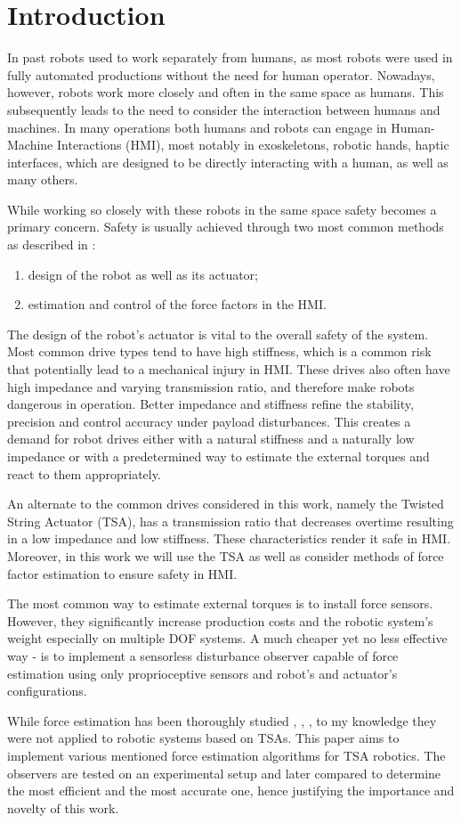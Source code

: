 
\chapter{Introduction}

In past robots used to work separately from humans, as most robots were used in fully automated productions without the need for human operator. Nowadays, however, robots work more closely and often in the same space as humans. This subsequently leads to the need to consider the interaction between humans and machines. In many operations both humans and robots can engage in Human-Machine Interactions (HMI), most notably in exoskeletons, robotic hands, haptic interfaces, which are designed to be directly interacting with a human, as well as many others.

While working so closely with these robots in the same space safety becomes a primary concern. Safety is usually achieved through two most common methods as described in \cite{eval_of_safety}:
\begin{enumerate}
    \item design of the robot as well as its actuator;
    \item estimation and control of the force factors in the HMI.
\end{enumerate}
The design of the robot's actuator is vital to the overall safety of the system. Most common drive types tend to have high stiffness, which is a common risk that potentially lead to a mechanical injury in HMI. These drives also often have high impedance and varying transmission ratio, and therefore make robots dangerous in operation. Better impedance and stiffness refine the stability, precision and control accuracy under payload disturbances. This creates a demand for robot drives either with a natural stiffness and a naturally low impedance or with a predetermined way to estimate the external torques and react to them appropriately.

An alternate to the common drives considered in this work, namely the Twisted String Actuator (TSA), has a transmission ratio that decreases overtime resulting in a low impedance and low stiffness. These characteristics render it safe in HMI. Moreover, in this work we will use the TSA as well as consider methods of force factor estimation to ensure safety in HMI.

The most common way to estimate external torques is to install force sensors. However, they significantly increase production costs and the robotic system's weight especially on multiple DOF systems. A much cheaper yet no less effective way - is to implement a sensorless disturbance observer capable of force estimation using only proprioceptive sensors and robot's and actuator's configurations.

While force estimation has been thoroughly studied \cite{collision}, \cite{momentum_obs}, \cite{sliding_mode}, to my knowledge they were not applied to robotic systems based on TSAs. This paper aims to implement various mentioned force estimation algorithms for TSA robotics. The observers are tested on an experimental setup and later compared to determine the most efficient and the most accurate one, hence justifying the importance and novelty of this work.